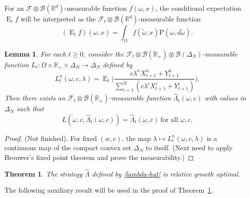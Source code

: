\documentclass[a4paper,11pt,english]{article}
\newtheorem{theorem}{Theorem}
\newtheorem{lemma}{Lemma}
\theoremstyle{definition}
\DeclareMathOperator{\E}{E}
\renewcommand{\hat}{\widehat}
\renewcommand{\tilde}{\widetilde}
\renewcommand{\P}{\mathrm{P}}
\newcommand{\F}{\mathcal{F}}
\newcommand{\R}{\mathbb{R}}
\begin{document}
For an $\F\otimes\mathcal{B}(\R^d)$-measurable function $f(\omega,x)$, the
conditional expectation $\E_t f$ will be interpreted as the
$\F_t\otimes\mathcal{B}(\R^d)$-measurable function
\[
(\E_t f)(\omega,x) = \int_\Omega f(\tilde \omega,x) \P(\omega,d\tilde \omega).
\]
 

\begin{lemma}
\label{lemma1}
For each $t\ge 0$, consider the $\F_t\otimes \mathcal{B}(\R_+)\otimes
\mathcal{B}(\Delta_N)$-measurable function $L_t \colon \Omega
\times \R_+ \times \Delta_N \to \Delta_N$ defined by
\[
L_t^n(\omega,c,\lambda) = \E_t\biggl(\frac{c\lambda^n
X_{t+1}^n + Y_{t+1}^n}{\sum_{i=1}^N (c \lambda^i X_{t+1}^i + Y_{t+1}^i)}\biggr).
\]
Then there exists an $\F_t\otimes\mathcal{B}(\R_+)$-measurable function $\hat
\Lambda_t(\omega,c)$ with values in $\Delta_N$ such that
\begin{equation}
L(\omega,c,\hat \Lambda_t(\omega,c)) = \hat \Lambda_t(\omega,c)\
\text{for all $\omega,c$}.\label{lambda-hat}
\end{equation}
\end{lemma}
\begin{proof}
(Not finished).
For fixed $(w,c)$, the map $\lambda\mapsto
L_t^n(\omega,c,\lambda)$ is a continuous map of the compact convex set $\Delta_N$ to
itself. (Next need to apply Brouwer's  fixed point theorem and prove the measurability.)
\end{proof}

\begin{theorem}
\label{theorem1}
The strategy $\hat \Lambda$ defined by \eqref{lambda-hat} is relative growth optimal.
\end{theorem}

The following auxiliary result will be used in the proof of
Theorem~\ref{theorem1}.
\end{document}
